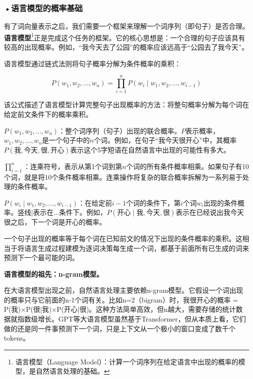

\subsubsection*{\textbf{•语言模型的概率基础}}

有了词向量表示之后，我们需要一个框架来理解一个词序列（即句子）是否合理。\textbf{语言模型}\footnote{语言模型（Language Model）：计算一个词序列在给定语言中出现的概率的模型，是自然语言处理的基础。}正是完成这个任务的框架。它的核心思想是：一个合理的句子应该具有较高的出现概率。例如，“我今天去了公园”的概率应该远高于“公园去了我今天”。

语言模型通过链式法则将句子概率分解为条件概率的乘积：

\[
P(w_1, w_2, ..., w_n) = \prod_{i=1}^{n} P(w_i \mid w_1, w_2, ..., w_{i-1})
\]

该公式描述了语言模型计算完整句子出现概率的方法：将整句概率分解为每个词在给定前文条件下的概率乘积。



$P(w_1, w_2, ..., w_n)$：整个词序列（句子）出现的联合概率。$P$表示概率，$w_1, w_2, ..., w_n$是一个句子中的$n$个词。例如，在句子“我今天很开心”中，其概率$P(\text{我}, \text{今天}, \text{很}, \text{开心})$表示这个5字短语在自然语言中出现的可能性有多大。

$\prod_{i=1}^{n}$：连乘符号，表示从第1个词到第$n$个词的所有条件概率相乘。如果句子有10个词，就是将10个条件概率相乘。连乘操作将复杂的联合概率拆解为一系列易于处理的条件概率。

$P(w_i \mid w_1, w_2, ..., w_{i-1})$：在给定前$i-1$个词的条件下，第$i$个词$w_i$出现的条件概率。竖线$\mid$表示在...条件下。例如，$P(\text{开心} \mid \text{我}, \text{今天}, \text{很})$表示在已经说出我今天很之后，下一个词是开心的概率。

一个句子出现的概率等于每个词在已知前文的情况下出现的条件概率的乘积。这相当于将语言生成过程建模为逐词决策每生成一个词，都基于前面所有已生成的词来预测下一个最可能的词。

\begin{knowledgebox}
\small
\textbf{语言模型的祖先：n-gram模型。}

在大语言模型出现之前，自然语言处理主要依赖n-gram模型。它假设一个词出现的概率只与它前面的n-1个词有关。比如n=2（bigram）时，我很开心的概率 = P(我)×P(很|我)×P(开心|很)。这种方法简单高效，但n越大，需要存储的统计数据就指数级增长。GPT等大语言模型虽然基于Transformer，但从本质上看，它们做的还是同一件事预测下一个词，只是上下文从一个极小的窗口变成了数千个tokens。
\end{knowledgebox}

